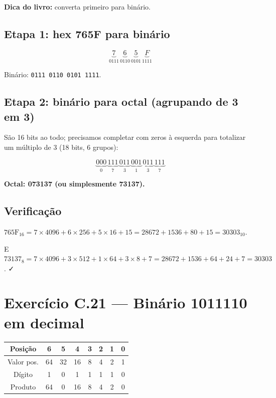 \documentclass[11pt,a4paper]{article}
\begin{document}
\textbf{Dica do livro:} converta primeiro para bin\'ario.

\subsection*{Etapa 1: hex 765F para bin\'ario}

\[
\underbrace{7}_{0111} \, \underbrace{6}_{0110} \, \underbrace{5}_{0101} \, \underbrace{F}_{1111}
\]

Bin\'ario: \texttt{0111 0110 0101 1111}.

\subsection*{Etapa 2: bin\'ario para octal (agrupando de 3 em 3)}

S\~ao 16 bits ao todo; precisamos completar com zeros \`a esquerda para totalizar um m\'ultiplo de 3 (18 bits, 6 grupos):

\[
\underbrace{000}_{0} \, \underbrace{111}_{7} \, \underbrace{011}_{3} \, \underbrace{001}_{1} \, \underbrace{011}_{3} \, \underbrace{111}_{7}
\]

\begin{resposta}\textbf{Octal: 073137 (ou simplesmente 73137).}\end{resposta}

\subsection*{Verifica\c{c}\~ao}

$\text{765F}_{16} = 7 \times 4096 + 6 \times 256 + 5 \times 16 + 15 = 28672 + 1536 + 80 + 15 = 30303_{10}$.

E $73137_8 = 7 \times 4096 + 3 \times 512 + 1 \times 64 + 3 \times 8 + 7 = 28672 + 1536 + 64 + 24 + 7 = 30303$. ✓

\section{Exerc\'icio C.21 --- Bin\'ario 1011110 em decimal}

\begin{center}
\renewcommand{\arraystretch}{1.2}
\begin{tabular}{|c|c|c|c|c|c|c|c|}
\hline
Posi\c{c}\~ao    & 6   & 5  & 4  & 3 & 2 & 1 & 0 \\
\hline
Valor pos. & 64  & 32 & 16 & 8 & 4 & 2 & 1 \\
\hline
D\'igito    & 1   & 0  & 1  & 1 & 1 & 1 & 0 \\
\hline
Produto   & 64  & 0  & 16 & 8 & 4 & 2 & 0 \\
\hline
\end{tabular}
\end{center}
\end{document}
